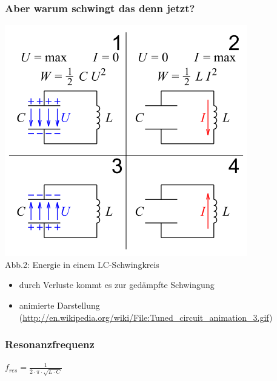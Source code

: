 \begin{frame}
\frametitle{Aber warum schwingt das denn jetzt?}
\begin{center}
	\includegraphics[scale=0.4]{e07/Schwingkreis.png}\\
	Abb.2: Energie in einem LC-Schwingkreis \cite{wmde} \\
	\vspace{3mm}
	\begin{itemize}
		\item durch Verluste kommt es zur gedämpfte Schwingung\\
		\item animierte Darstellung (\url{http://en.wikipedia.org/wiki/File:Tuned_circuit_animation_3.gif})
	\end{itemize}
\end{center}
\end{frame}

\begin{frame}
\frametitle{Resonanzfrequenz}
\begin{center}
	\Huge{$ f_{res} = \frac{1}{2 \cdot \pi \cdot \sqrt{L \cdot C}} $}
\end{center}
\end{frame}

